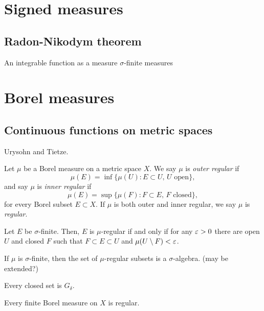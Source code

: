 \documentclass{../../large}
\begin{document}
\chapter{Signed measures}




\section{Radon-Nikodym theorem}

An integrable function as a measure
$\sigma$-finite measures



\chapter{Borel measures}



\section{Continuous functions on metric spaces}

Urysohn and Tietze.


\begin{prb}
Let $\mu$ be a Borel measure on a metric space $X$.
We say $\mu$ is \emph{outer regular} if
\[\mu(E)=\inf\{\mu(U):E\subset U,\,U\text{ open}\},\]
and say $\mu$ is \emph{inner regular} if
\[\mu(E)=\sup\{\mu(F):F\subset E,\,F\text{ closed}\},\]
for every Borel subset $E\subset X$.
If $\mu$ is both outer and inner regular, we say $\mu$ is \emph{regular}.
\begin{parts}
\item Let $E$ be $\sigma$-finite. Then, $E$ is $\mu$-regular if and only if for any $\varepsilon>0$ there are open $U$ and closed $F$ such that $F\subset E\subset U$ and $\mu(U\setminus F)<\varepsilon$.
\item If $\mu$ is $\sigma$-finite, then the set of $\mu$-regular subsets is a $\sigma$-algebra. (may be extended?)
\item Every closed set is $G_\delta$.
\item Every finite Borel measure on $X$ is regular.
\end{parts}
\end{prb}
\begin{pf}
\end{pf}
\end{document}

